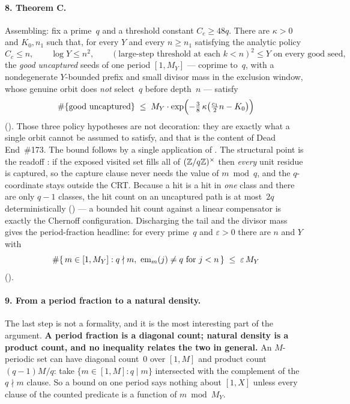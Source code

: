 \paragraph{8.  Theorem C.}
Assembling: fix a prime~$q$ and a threshold constant $C_c \ge 48q$.  There
are $\kappa>0$ and $K_0, n_1$ such that, for every $Y$ and every
$n \ge n_1$ satisfying the analytic policy
\[
  C_c \le n, \qquad \log Y \le n^2,
  \qquad (\text{large-step threshold at each } k<n)^2 \le Y
  \text{ on every good seed},
\]
the \emph{good uncaptured} seeds of one period $[1,M_Y]$ ---
coprime to~$q$, with a nondegenerate $Y$-bounded prefix and small divisor
mass in the exclusion window, whose genuine orbit does \emph{not} select~$q$
before depth~$n$ --- satisfy
\[
  \#\{\text{good uncaptured}\}
  \;\leq\; M_Y \cdot \exp\Bigl(-\tfrac38\,\kappa\bigl(\tfrac{c_1}{2}n - K_0\bigr)\Bigr)
\]
().  Those three policy
hypotheses are not decoration: they are exactly what a single orbit cannot
be assumed to satisfy, and that is the content of Dead End~\#173.  The
bound follows by a single application of
.  The
structural point is the readoff
: if the
exposed visited set fills all of $(\mathbb{Z}/q\mathbb{Z})^\times$ then \emph{every} unit
residue is captured, so the capture clause never needs the value of
$m \bmod q$, and the $q$-coordinate stays outside the CRT.  Because a hit
is a hit in \emph{one} class and there are only $q-1$ classes, the hit
count on an uncaptured path is at most~$2q$ deterministically
() --- a bounded hit
count against a linear compensator is exactly the Chernoff configuration.
Discharging the tail and the divisor mass gives the period-fraction
headline: for every prime~$q$ and $\varepsilon>0$ there are $n$ and $Y$
with
\[
  \#\{\, m \in [1,M_Y] : q \nmid m,\ \seq{m}(j)\ne q \text{ for } j<n \,\}
    \;\leq\; \varepsilon\, M_Y
\]
().

\paragraph{9.  From a period fraction to a natural density.}
The last step is not a formality, and it is the most interesting part of
the argument.  \textbf{A period fraction is a diagonal count; natural
density is a product count, and no inequality relates the two in general.}
An $M$-periodic set can have diagonal count~$0$ over $[1,M]$ and product
count $(q{-}1)M/q$: take $\{m \in [1,M] : q \mid m\}$ intersected with the
complement of the $q\nmid m$ clause.  So a bound on one period says nothing
about $[1,X]$ unless every clause of the counted predicate is a function of
$m \bmod M_Y$.

